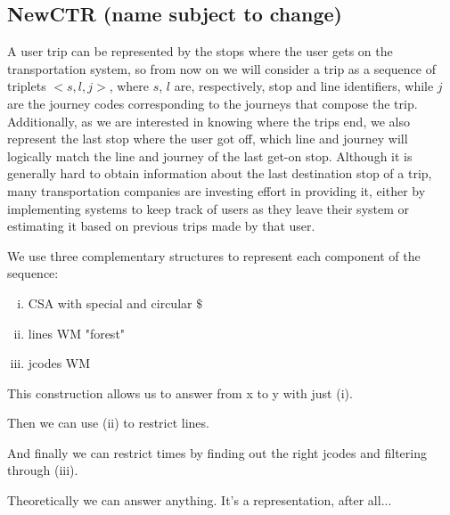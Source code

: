 \documentclass[runningheads]{llncs}
\newcommand{\ctr}{NewCTR (name subject to change)\ }
\begin{document}
\subsection{\ctr}
A user trip can be represented by the stops where the user gets on the transportation system, so from now on we will consider a trip as a sequence of triplets $<s,l,j>$, where $s$, $l$ are, respectively, stop and line identifiers, while $j$ are the journey codes corresponding to the journeys that compose the trip. Additionally, as we are interested in knowing where the trips end, we also represent the last stop where the user got off, which line and journey will logically match the line and journey of the last get-on stop. Although it is generally hard to obtain information about the last destination stop of a trip, many transportation companies are investing effort in providing it, either by implementing systems to keep track of users as they leave their system or estimating it based on previous trips made by that user.

We use three complementary structures to represent each component of the sequence:
\begin{enumerate}[(i)]
    \item CSA with special and circular $\$$
    \item lines WM "forest"
    \item jcodes WM
\end{enumerate}

This construction allows us to answer from x to y with just (i).

Then we can use (ii) to restrict lines.

And finally we can restrict times by finding out the right jcodes and filtering through (iii).

Theoretically we can answer anything. It's a representation, after all...
\end{document}
